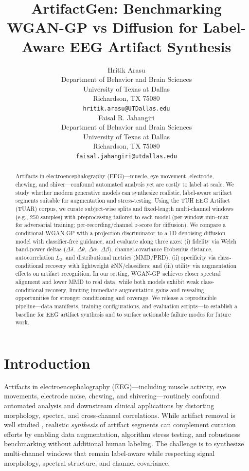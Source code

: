 \documentclass{article}
\title{ArtifactGen: Benchmarking WGAN-GP vs Diffusion for Label-Aware EEG Artifact Synthesis}
\author{
  Hritik Arasu \\
  Department of Behavior and Brain Sciences\\
  University of Texas at Dallas\\
  Richardson, TX 75080 \\
  \texttt{hritik.arasu@UTDallas.edu} \\
  \And
  Faisal R. Jahangiri \\
  Department of Behavior and Brain Sciences\\
  University of Texas at Dallas\\
  Richardson, TX 75080 \\
  \texttt{faisal.jahangiri@utdallas.edu} \\
}
\begin{document}
\maketitle


\begin{abstract}
Artifacts in electroencephalography (EEG)---muscle, eye movement, electrode, chewing, and shiver---confound automated analysis yet are costly to label at scale. We study whether modern generative models can synthesize realistic, label-aware artifact segments suitable for augmentation and stress-testing. Using the TUH EEG Artifact (TUAR) corpus, we curate subject-wise splits and fixed-length multi-channel windows (e.g., 250 samples) with preprocessing tailored to each model (per-window min--max for adversarial training; per-recording/channel $z$-score for diffusion). We compare a conditional WGAN-GP with a projection discriminator to a 1D denoising diffusion model with classifier-free guidance, and evaluate along three axes: (i) fidelity via Welch band-power deltas ($\Delta\delta,\ \Delta\theta,\ \Delta\alpha,\ \Delta\beta$), channel-covariance Frobenius distance, autocorrelation $L_2$, and distributional metrics (MMD/PRD); (ii) specificity via class-conditional recovery with lightweight $k$NN/classifiers; and (iii) utility via augmentation effects on artifact recognition. In our setting, WGAN-GP achieves closer spectral alignment and lower MMD to real data, while both models exhibit weak class-conditional recovery, limiting immediate augmentation gains and revealing opportunities for stronger conditioning and coverage. We release a reproducible pipeline---data manifests, training configurations, and evaluation scripts---to establish a baseline for EEG artifact synthesis and to surface actionable failure modes for future work.
\end{abstract}


\section{Introduction}
Artifacts in electroencephalography (EEG)—including muscle activity, eye movements, electrode noise, chewing, and shivering—routinely confound automated analysis and downstream clinical applications by distorting morphology, spectra, and cross-channel correlations. While artifact removal is well studied \citep{uriguen2015artifactremoval,jiang2019artifactremoval}, realistic \emph{synthesis} of artifact segments can complement curation efforts by enabling data augmentation, algorithm stress testing, and robustness benchmarking without additional human labeling. The challenge is to synthesize multi-channel windows that remain label-aware while respecting signal morphology, spectral structure, and channel covariance.
\end{document}
